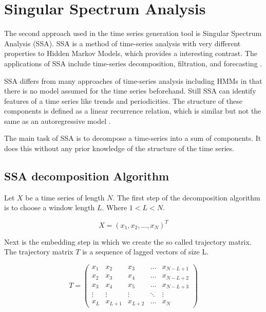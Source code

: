 
\chapter{Singular Spectrum Analysis}\label{chapter:ssa}

The second approach used in the time series generation tool is Singular Spectrum Analysis (SSA). SSA is a method of time-series analysis with very different properties to Hidden Markov Models, which provides a interesting contrast. The applications of SSA include time-series decomposition, filtration, and forecasting \parencite{golyandina2013singular}.

SSA differs from many approaches of time-series analysis including HMMs in that there is no model assumed for the time series beforehand. Still SSA can identify features of a time series like trends and periodicities. The structure of these components is defined as a linear recurrence relation, which is similar but not the same as an autoregressive model \parencite{golyandina2014basic}.

The main task of SSA is to decompose a time-series into a sum of components. It does this without any prior knowledge of the structure of the time series. 

\section{SSA decomposition Algorithm}

Let $X$ be a time series of length $N$. The first step of the decomposition algorithm is to choose a window length $L$. Where $1 < L < N$. 

\begin{equation}
   X = (x_1, x_2, \ldots ,x_N)^T
\end{equation}

Next is the embedding step in which we create the so called trajectory matrix. The trajectory matrix $T$ is a sequence of lagged vectors of size L. 

\begin{equation}
   T = 
\left(\begin{array}{ccccc}
x_{1} & x_{2} & x_{3} & \dots & x_{N-L+1} \\
x_{2} & x_{3} & x_{4} & \dots & x_{N-L+2} \\
x_{3} & x_{4} & x_{5} & \dots & x_{N-L+3} \\
\vdots & \vdots & \vdots & \ddots & \vdots \\
x_{L} & x_{L+1} & x_{L+2} & \dots & x_{N}
\end{array}\right)
   \label{eq:ssa-trajectory}
\end{equation}

